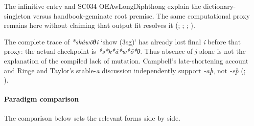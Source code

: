 \documentclass[
  british,
  a4paper,
]{article}
\providecommand{\Recon}[1]{\emph{*#1}}
\begin{document}
The infinitive entry and SC034 OEAwLongDiphthong explain the
dictionary-singleton versus handbook-geminate root premise. The same
computational proxy remains here without claiming that output fit
resolves it (;
;
;
).

The complete trace of \Recon{skáwōθi} `show (3sg)' has already lost
final \emph{i} before that proxy: the actual checkpoint is
\emph{*s*k*á*w*ō*θ}. Thus absence of \emph{j} alone is not the
explanation of the compiled lack of mutation. Campbell's late-shortening
account and Ringe and Taylor's stable-\emph{a} discussion independently
support \emph{-aþ}, not \emph{-eþ} (; ).

\paragraph{Paradigm comparison}\label{paradigm-comparison-20}

The comparison below sets the relevant forms side by side.
\end{document}
